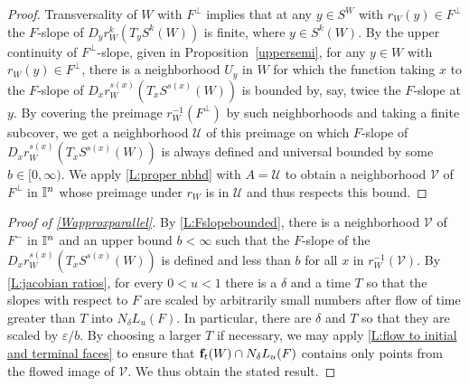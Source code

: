 \begin{proof}
	Transversality of $W$ with $F^\perp$ implies that at any $y \in S^W$ with $r_W(y) \in F^\perp$ the $F$-slope of $D_yr^k_W(T_yS^k(W))$ is finite, where $y \in S^k(W)$.
	By the upper continuity of $F^\perp$-slope, given in Proposition~\ref{uppersemi}, for any $y \in W$ with $r_W(y) \in F^\perp$, there is a neighborhood $U_y$ in $W$ for which the function taking $x$ to the $F$-slope of $D_xr^{s(x)}_W(T_xS^{s(x)}(W))$ is bounded by, say, twice the $F$-slope at $y$.
	By covering the preimage $r_W^{-1}(F^\perp)$ by such neighborhoods and taking a finite subcover, we get a neighborhood ${\mathcal U}$ of this preimage on which $F$-slope of $D_xr^{s(x)}_W(T_xS^{s(x)}(W))$ is always defined and universal bounded by some $b \in [0,\infty)$.
	We apply \cref{L:proper nbhd} with $A = {\mathcal U}$ to obtain a neighborhood $\mathcal{V}$ of $F^\perp$ in $\mathbb{I}^n$ whose preimage under $r_W$ is in ${\mathcal U}$ and thus respects this bound.
\end{proof}


\begin{proof}[Proof of \cref{Wapproxparallel}]
By \cref{L:Fslopebounded}, there is a neighborhood $\mathcal{V}$ of $F^-$ in $\mathbb{I}^n$ and an upper bound $b < \infty$ such that the $F$-slope of the $D_xr^{s(x)}_W(T_xS^{s(x)}(W))$ is defined and less than $b$ for all $x$ in $r_W^{-1}(\mathcal{V})$.
By \cref{L:jacobian ratios}, for every $0 < u < 1$ there is a $\delta$ and a time $T$ so that the slopes with respect to $F$ are scaled by arbitrarily small numbers after flow of time greater than $T$ into $N_\delta L_u(F)$.
In particular, there are $\delta$ and $T$ so that they are scaled by $\varepsilon/ b$.
By choosing a larger $T$ if necessary, we may apply \cref{L:flow to initial and terminal faces} to ensure that $\mathbf{f}_t(W) \cap N_\delta L_u(F)$ contains only points from the flowed image of ${\mathcal{V}}$.
We thus obtain the stated result.
\end{proof}


